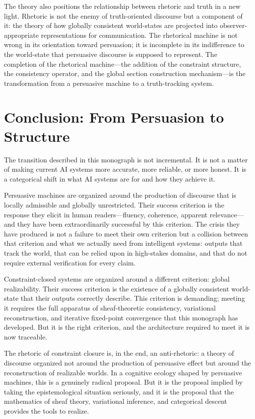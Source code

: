 \documentclass[11pt, oneside]{article}
\begin{document}
The theory also positions the relationship between rhetoric and truth in a new light. Rhetoric is not the enemy of truth-oriented discourse but a component of it: the theory of how globally consistent world-states are projected into observer-appropriate representations for communication. The rhetorical machine is not wrong in its orientation toward persuasion; it is incomplete in its indifference to the world-state that persuasive discourse is supposed to represent. The completion of the rhetorical machine---the addition of the constraint structure, the consistency operator, and the global section construction mechanism---is the transformation from a persuasive machine to a truth-tracking system.

\section*{Conclusion: From Persuasion to Structure}

The transition described in this monograph is not incremental. It is not a matter of making current AI systems more accurate, more reliable, or more honest. It is a categorical shift in what AI systems are for and how they achieve it.

Persuasive machines are organized around the production of discourse that is locally admissible and globally unrestricted. Their success criterion is the response they elicit in human readers---fluency, coherence, apparent relevance---and they have been extraordinarily successful by this criterion. The crisis they have produced is not a failure to meet their own criterion but a collision between that criterion and what we actually need from intelligent systems: outputs that track the world, that can be relied upon in high-stakes domains, and that do not require external verification for every claim.

Constraint-closed systems are organized around a different criterion: global realizability. Their success criterion is the existence of a globally consistent world-state that their outputs correctly describe. This criterion is demanding; meeting it requires the full apparatus of sheaf-theoretic consistency, variational reconstruction, and iterative fixed-point convergence that this monograph has developed. But it is the right criterion, and the architecture required to meet it is now traceable.

The rhetoric of constraint closure is, in the end, an anti-rhetoric: a theory of discourse organized not around the production of persuasive effect but around the reconstruction of realizable worlds. In a cognitive ecology shaped by persuasive machines, this is a genuinely radical proposal. But it is the proposal implied by taking the epistemological situation seriously, and it is the proposal that the mathematics of sheaf theory, variational inference, and categorical descent provides the tools to realize.
\end{document}
